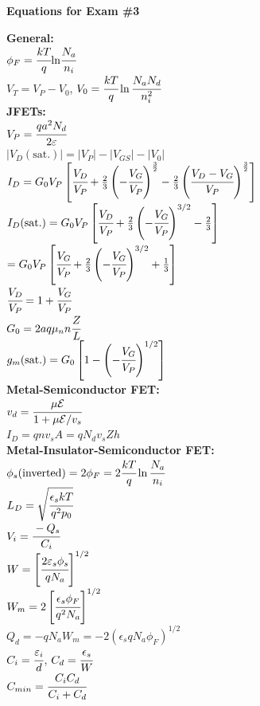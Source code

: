 \documentclass[8pt]{article}
\newcommand{\sect}[1]{\noindent\textbf{#1}\\}
\newcommand\tab[1][1cm]{\hspace*{#1}}
\begin{document}
	\noindent\begin{center}\textbf{Equations for Exam \#3}\end{center}
	\setlength{\columnseprule}{0.4pt}
	\begin{multicols*}{2}
		\begin{small}
		\sect{General:}
		$\phi_F = \cfrac{kT}{q} \text{ln} \cfrac{N_a}{n_i}$ \\
		$ V_T = V_P - V_0 $, \tab[0.25cm] $ V_0 = \cfrac{kT}{q} \ln \cfrac{N_a N_d}{n_i^2} $ \\
		\sect{JFETs:}
		$ V_P = \cfrac{q a^2 N_d}{2\varepsilon} $ \\
		$ |V_D(\text{sat.})| = |V_P| - |V_{GS}| - |V_0| $ \\
		$ I_D = G_0V_P\left[ \cfrac{V_D}{V_P} + \frac{2}{3}\left( -\cfrac{V_G}{V_P} \right)^{\frac{3}{2}} - \frac{2}{3} \left( \cfrac{V_D-V_G}{V_P} \right)^{\frac{3}{2}} \right] $ \\
		$ I_D(\text{sat.}) = G_0V_P\left[ \cfrac{V_D}{V_P} + \frac{2}{3} \left( - \cfrac{V_G}{V_P} \right)^{3/2} - \frac{2}{3} \right]  $ \\
		\tab[1.21cm] $ = G_0 V_P \left[ \cfrac{V_G}{V_P} + \frac{2}{3} \left( - \cfrac{V_G}{V_P} \right)^{3/2} + \frac{1}{3} \right] $ \\
		$ \cfrac{V_D}{V_P} = 1 + \cfrac{V_G}{V_P} $ \\
		$ G_0 = 2aq\mu_nn\cfrac{Z}{L} $ \\
		$ g_m(\text{sat.}) = G_0 \left[ 1 - \left(-\cfrac{V_G}{V_P}\right)^{1/2} \right] $\\
		\sect{Metal-Semiconductor FET:}
		$v_d = \cfrac{\mu \mathcal{E}}{1 + \mu \mathcal{E} / v_s} $ \\
		$ I_D = qnv_sA=qN_dv_sZh $ \\
		\sect{Metal-Insulator-Semiconductor FET:}
		$\phi_s(\text{inverted}) = 2\phi_F = 2\cfrac{kT}{q} \ln \cfrac{N_a}{n_i} $ \\
		$ L_D = \sqrt{\cfrac{\epsilon_s k T}{q^2 p_0}} $ \\
		$ V_i = \cfrac{-Q_s}{C_i} $ \\
		$ W = \left[ \cfrac{2 \varepsilon_s \phi_s}{qN_a} \right]^{1/2} $\\ 
		$ W_m = 2 \left[ \cfrac{\epsilon_s \phi_F}{q^2 N_a} \right]^{1/2} $ \\
		$ Q_d = -qN_aW_m = -2(\epsilon_sqN_a\phi_F)^{1/2} $ \\
		$ C_i = \cfrac{\varepsilon_i}{d} $, \tab[0.25cm] $ C_d = \cfrac{\epsilon_s}{W} $ \\
		$ C_{min} = \cfrac{C_iC_d}{C_i + C_d} $ \\

\end{small}
\end{multicols*}
\end{document}
